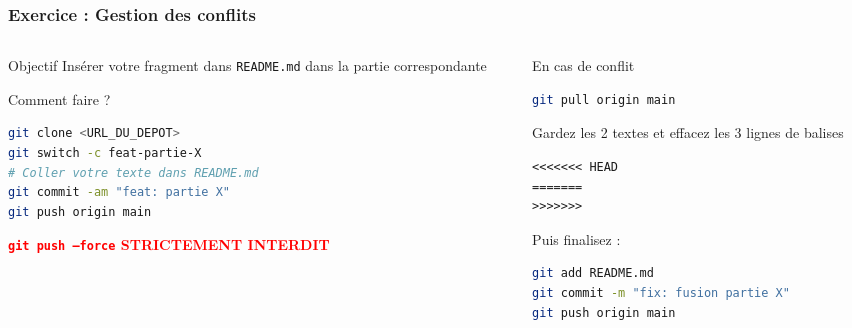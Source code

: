 \documentclass[
	11pt,
	aspectratio=169
]{beamer}
\begin{document}
\begin{frame}[fragile]
    \frametitle{Exercice : Gestion des conflits}

    \begin{columns}[t]
        \begin{column}{0.48\textwidth}
            \begin{block}{\footnotesize Objectif}
                \scriptsize
                Insérer votre fragment dans \texttt{README.md} dans la partie correspondante
            \end{block}

            \begin{exampleblock}{\footnotesize Comment faire ?}
\begin{lstlisting}[language=bash, basicstyle=\ttfamily\scriptsize]
git clone <URL_DU_DEPOT>
git switch -c feat-partie-X
# Coller votre texte dans README.md
git commit -am "feat: partie X"
git push origin main
\end{lstlisting}
            \end{exampleblock}

            \centering \scriptsize
            \textbf{\textcolor{red}{\texttt{git push --force} STRICTEMENT INTERDIT}}
        \end{column}

        \begin{column}{0.48\textwidth}
            \begin{alertblock}{\footnotesize En cas de conflit}
                \scriptsize
\begin{lstlisting}[language=bash]
git pull origin main
\end{lstlisting}

                \scriptsize
                Gardez les 2 textes et effacez les 3 lignes de balises
\begin{lstlisting}
<<<<<<< HEAD
=======
>>>>>>>
\end{lstlisting}
                Puis finalisez :
\begin{lstlisting}[language=bash]
git add README.md
git commit -m "fix: fusion partie X"
git push origin main
\end{lstlisting}
            \end{alertblock}
        \end{column}
    \end{columns}
\end{frame}
\end{document}
